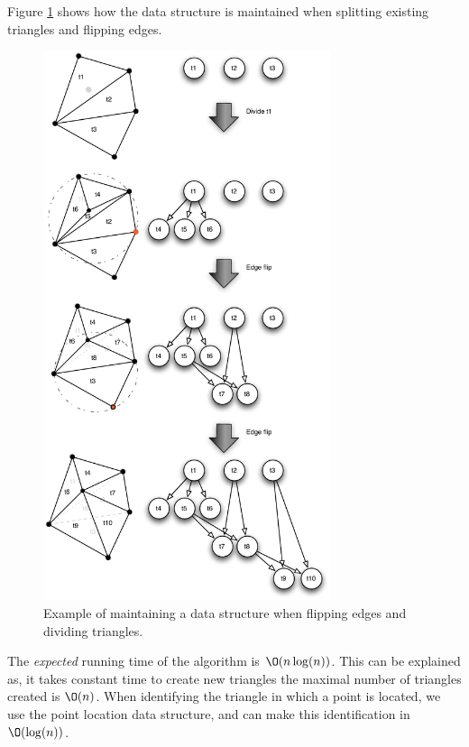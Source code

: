 \documentclass[10pt]{article}
\begin{document}
Figure \ref{fig9} shows how the data structure is maintained when splitting existing triangles and flipping edges.
\begin{figure}[ht]
\centering
\includegraphics[width=0.75\textwidth]{figures/fig9.pdf}
\caption{Example of maintaining a data structure when flipping edges and dividing triangles.}
\label{fig9}
\end{figure}

The \emph{expected} running time of the algorithm is $\O(n\log(n))$. This can be explained as, it takes constant time to create new triangles the maximal number of triangles created is $\O(n)$. When identifying the triangle in which a point is located, we use the point location data structure, and can make this identification in $\O(\log(n))$.

\end{document}
